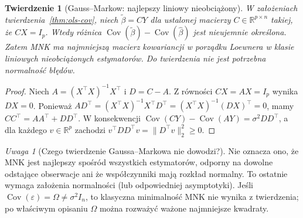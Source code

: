 \documentclass[11pt,a4paper,oneside]{report}
\numberwithin{equation}{chapter}
\theoremstyle{plain}
\newtheorem{twierdzenie}{Twierdzenie}[chapter]
\theoremstyle{definition}
\theoremstyle{remark}
\newtheorem{uwaga}{Uwaga}[chapter]
\newcommand{\R}{\mathbb R}
\newcommand{\Cov}{\operatorname{Cov}}
\begin{document}
\begin{twierdzenie}[Gauss--Markow: najlepszy liniowy nieobciążony]
\label{thm:gauss-markov}
W założeniach twierdzenia~\ref{thm:ols-cov}, niech
$\widetilde\beta=CY$ dla ustalonej macierzy
$C\in\R^{p\times n}$ takiej, że $CX=I_p$.
Wtedy różnica
$\Cov(\widetilde\beta)-\Cov(\widehat\beta)$
jest nieujemnie określona. Zatem MNK ma najmniejszą
macierz kowariancji w porządku Loewnera \emph{w klasie
liniowych nieobciążonych estymatorów}.
Do twierdzenia nie jest potrzebna normalność błędów.
\end{twierdzenie}
\begin{proof}
Niech $A=(X^\top X)^{-1}X^\top$ i $D=C-A$.
Z równości $CX=AX=I_p$ wynika $DX=0$.
Ponieważ $AD^\top=(X^\top X)^{-1}X^\top D^\top
=(X^\top X)^{-1}(DX)^\top=0$, mamy
$CC^\top=AA^\top+DD^\top$.
W konsekwencji
$\Cov(CY)-\Cov(AY)=\sigma^2DD^\top$,
a dla każdego $v\in\R^p$ zachodzi
$v^\top DD^\top v=\|D^\top v\|_2^2\ge0$.
\end{proof}

\begin{uwaga}[Czego twierdzenie Gaussa--Markowa nie dowodzi?]
Nie oznacza ono, że MNK jest najlepszy spośród wszystkich
estymatorów, odporny na dowolne odstające obserwacje ani że
współczynniki mają rozkład normalny. To ostatnie wymaga
założenia normalności (lub odpowiedniej asymptotyki).
Jeśli $\Cov(\varepsilon)=\Omega\ne\sigma^2I_n$,
to klasyczna minimalność MNK nie wynika z twierdzenia;
po właściwym opisaniu $\Omega$ można rozważyć ważone
najmniejsze kwadraty.
\end{uwaga}
\end{document}
